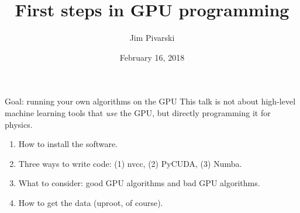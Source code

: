 \documentclass[aspectratio=169]{beamer}
\title[2018-02-16-gpu-programming]{First steps in GPU programming}
\author{Jim Pivarski}
\institute{Princeton University -- DIANA-HEP}
\date{February 16, 2018}
\begin{document}

\begin{frame}
  \titlepage
\end{frame}




\begin{frame}{Goal: running your own algorithms on the GPU}
\vspace{0.5 cm}
\large
This talk is not about high-level machine learning tools that {\it use} the GPU, but directly programming it for physics.

\begin{enumerate}
\item How to install the software.
\item Three ways to write code: (1) nvcc, (2) PyCUDA, (3) Numba.
\item What to consider: good GPU algorithms and bad GPU algorithms.
\item How to get the data (uproot, of course).
\end{enumerate}
\end{frame}
\end{document}
